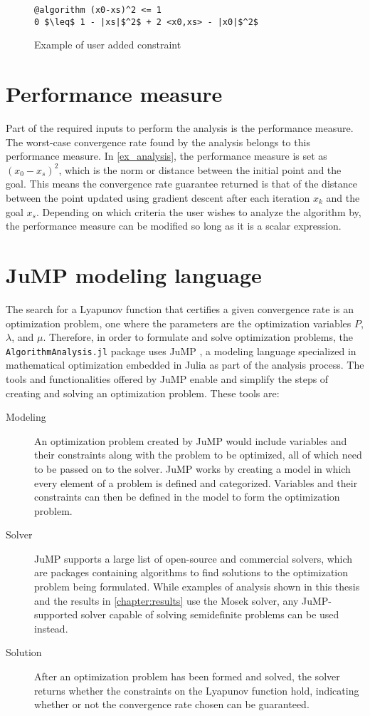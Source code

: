 \begin{figure}[h]
	\begin{lstlisting}[mathescape]
@algorithm (x0-xs)^2 <= 1
0 $\leq$ 1 - |xs|$^2$ + 2 <x0,xs> - |x0|$^2$
	\end{lstlisting}
	\caption{Example of user added constraint}
	\label{ex_user_constraints}
\end{figure}

\section{Performance measure}
Part of the required inputs to perform the analysis is the performance measure. The worst-case convergence rate found by the analysis belongs to this performance measure. In \cref{ex_analysis}, the performance measure is set as $ (x_0 - x_s) ^2 $, which is the norm or distance between the initial point and the goal. This means the convergence rate guarantee returned is that of the distance between the point updated using gradient descent after each iteration $ x_k $ and the goal $ x_s $. Depending on which criteria the user wishes to analyze the algorithm by, the performance measure can be modified so long as it is a scalar expression.

\section{JuMP modeling language}
The search for a Lyapunov function that certifies a given convergence rate is an optimization problem, one where the parameters are the optimization variables $P$, $\lambda$, and $\mu$. Therefore, in order to formulate and solve optimization problems, the \texttt{AlgorithmAnalysis.jl} package uses JuMP \cite{jump}, a modeling language specialized in mathematical optimization embedded in Julia as part of the analysis process. The tools and functionalities offered by JuMP enable and simplify the steps of creating and solving an optimization problem. These tools are:

\begin{description}
	\item[Modeling] An optimization problem created by JuMP would include variables and their constraints along with the problem to be optimized, all of which need to be passed on to the solver. JuMP works by creating a model in which every element of a problem is defined and categorized. Variables and their constraints can then be defined in the model to form the optimization problem.
	\item[Solver] JuMP supports a large list of open-source and commercial solvers, which are packages containing algorithms to find solutions to the optimization problem being formulated. While examples of analysis  shown in this thesis and the results in \cref{chapter:results} use the Mosek \cite{mosek} solver, any JuMP-supported solver capable of solving semidefinite problems can be used instead.
	\item[Solution] After an optimization problem has been formed and solved, the solver returns whether the constraints on the Lyapunov function hold, indicating whether or not the convergence rate chosen can be guaranteed. 	 
\end{description}

